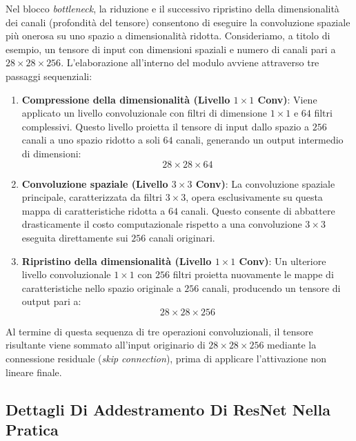 ﻿\documentclass[11pt, a4paper]{article}
\begin{document}
Nel blocco \emph{bottleneck}, la riduzione e il successivo ripristino della dimensionalità dei canali (profondità del tensore) consentono di eseguire la convoluzione spaziale più onerosa su uno spazio a dimensionalità ridotta. Consideriamo, a titolo di esempio, un tensore di input con dimensioni spaziali e numero di canali pari a $28 \times 28 \times 256$. L'elaborazione all'interno del modulo avviene attraverso tre passaggi sequenziali:

\begin{enumerate}
    \item \textbf{Compressione della dimensionalità (Livello $1 \times 1$ Conv)}: Viene applicato un livello convoluzionale con filtri di dimensione $1 \times 1$ e $64$ filtri complessivi. Questo livello proietta il tensore di input dallo spazio a $256$ canali a uno spazio ridotto a soli $64$ canali, generando un output intermedio di dimensioni:
    \[
    28 \times 28 \times 64
    \]
    \item \textbf{Convoluzione spaziale (Livello $3 \times 3$ Conv)}: La convoluzione spaziale principale, caratterizzata da filtri $3 \times 3$, opera esclusivamente su questa mappa di caratteristiche ridotta a $64$ canali. Questo consente di abbattere drasticamente il costo computazionale rispetto a una convoluzione $3 \times 3$ eseguita direttamente sui $256$ canali originari.
    \item \textbf{Ripristino della dimensionalità (Livello $1 \times 1$ Conv)}: Un ulteriore livello convoluzionale $1 \times 1$ con $256$ filtri proietta nuovamente le mappe di caratteristiche nello spazio originale a $256$ canali, producendo un tensore di output pari a:
    \[
    28 \times 28 \times 256
    \]
\end{enumerate}

Al termine di questa sequenza di tre operazioni convoluzionali, il tensore risultante viene sommato all'input originario di $28 \times 28 \times 256$ mediante la connessione residuale (\emph{skip connection}), prima di applicare l'attivazione non lineare finale.


\subsection{Dettagli Di Addestramento Di ResNet Nella Pratica}
\end{document}
